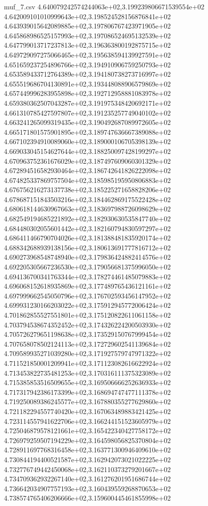 \begin{filecontents*}{muf_7.csv}
4.640079242574244063e+02,3.199239806671539554e+02
4.642009101010999643e+02,3.198524528156876841e+02
4.643939015642089885e+02,3.197806767423971905e+02
4.645868986525157993e+02,3.197086524695132539e+02
4.647799013717237813e+02,3.196363800192875715e+02
4.649729097275066465e+02,3.195638594139927591e+02
4.651659237254896766e+02,3.194910906759250793e+02
4.653589433712764389e+02,3.194180738273716997e+02
4.655519686704130891e+02,3.193448088906579869e+02
4.657449996283955898e+02,3.192712958881083978e+02
4.659380362507043287e+02,3.191975348420692171e+02
4.661310785427597807e+02,3.191235257749040102e+02
4.663241265099319435e+02,3.190492687089972605e+02
4.665171801575901895e+02,3.189747636667389088e+02
4.667102394910089060e+02,3.189000106705398139e+02
4.669033045154627644e+02,3.188250097428199297e+02
4.670963752361676029e+02,3.187497609060301329e+02
4.672894516582930464e+02,3.186742641826222098e+02
4.674825337869757504e+02,3.185985195950806883e+02
4.676756216273137738e+02,3.185225271658828206e+02
4.678687151843503216e+02,3.184462869175522428e+02
4.680618144630967663e+02,3.183697988726098629e+02
4.682549194685221892e+02,3.182930630535847740e+02
4.684480302055601442e+02,3.182160794830597297e+02
4.686411466790704026e+02,3.181388481835920174e+02
4.688342688939138156e+02,3.180613691777816712e+02
4.690273968548748940e+02,3.179836424882414576e+02
4.692205305667236530e+02,3.179056681375996050e+02
4.694136700341763344e+02,3.178274461485079883e+02
4.696068152618935869e+02,3.177489765436121161e+02
4.697999662545050796e+02,3.176702593456147952e+02
4.699931230166203022e+02,3.175912945772006424e+02
4.701862855527551801e+02,3.175120822611061158e+02
4.703794538674352452e+02,3.174326224200503930e+02
4.705726279651198638e+02,3.173529150767999454e+02
4.707658078502124113e+02,3.172729602541139684e+02
4.709589935271039280e+02,3.171927579747971322e+02
4.711521850001209941e+02,3.171123082616622924e+02
4.713453822735481253e+02,3.170316111375323089e+02
4.715385853516509655e+02,3.169506666252636933e+02
4.717317942386173399e+02,3.168694747477111378e+02
4.719250089386245577e+02,3.167880355277629860e+02
4.721182294557740420e+02,3.167063489883421425e+02
4.723114557941622706e+02,3.166244151523605979e+02
4.725046879578121661e+02,3.165422340427758172e+02
4.726979259507194229e+02,3.164598056825370804e+02
4.728911697768316458e+02,3.163771300946409610e+02
4.730844194400521587e+02,3.162942073021022225e+02
4.732776749442450068e+02,3.162110373279201667e+02
4.734709362932267140e+02,3.161276201951686744e+02
4.736642034907757193e+02,3.160439559268870653e+02
4.738574765406206666e+02,3.159600445461855998e+02

\end{filecontents*}
